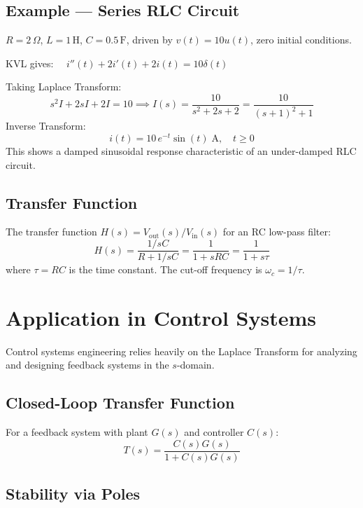 \documentclass[12pt]{article}
\begin{document}
\subsection*{Example --- Series RLC Circuit}

\begin{examplebox}
$R = 2\,\Omega$, $L = 1\,\text{H}$, $C = 0.5\,\text{F}$, driven by $v(t) = 10u(t)$, zero initial conditions.

\medskip
KVL gives: $\quad i''(t) + 2i'(t) + 2i(t) = 10\delta(t)$

Taking Laplace Transform:
\[
  s^2 I + 2sI + 2I = 10 \implies I(s) = \frac{10}{s^2+2s+2} = \frac{10}{(s+1)^2+1}
\]
Inverse Transform:
\[
  \boxed{i(t) = 10\,e^{-t}\sin(t)\;\text{A}, \quad t \geq 0}
\]
This shows a damped sinusoidal response characteristic of an under-damped RLC circuit.
\end{examplebox}

\subsection*{Transfer Function}

The transfer function $H(s) = V_\text{out}(s)/V_\text{in}(s)$ for an RC low-pass filter:
\[
  H(s) = \frac{1/sC}{R + 1/sC} = \frac{1}{1 + sRC} = \frac{1}{1+s\tau}
\]
where $\tau = RC$ is the time constant. The cut-off frequency is $\omega_c = 1/\tau$.

\section{Application in Control Systems}

Control systems engineering relies heavily on the Laplace Transform for analyzing and designing
feedback systems in the $s$-domain.

\subsection*{Closed-Loop Transfer Function}

For a feedback system with plant $G(s)$ and controller $C(s)$:
\[
  T(s) = \frac{C(s)G(s)}{1 + C(s)G(s)}
\]

\subsection*{Stability via Poles}
\end{document}

